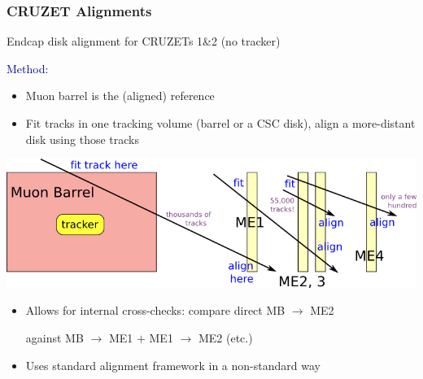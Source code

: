 \documentclass[compress]{beamer}
\begin{document}
\begin{frame}
\frametitle{CRUZET Alignments}
\small

\vspace{0.2 cm}
Endcap disk alignment for CRUZETs 1\&2 (no tracker)

\vspace{0.4 cm}
\hspace{-0.83 cm} \textcolor{darkblue}{\Large Method:}

\begin{itemize}
\item Muon barrel is the (aligned) reference
\item Fit tracks in one tracking volume (barrel or a CSC disk), align
  a more-distant disk using those tracks
\end{itemize}

\begin{center}
\includegraphics[width=0.8\linewidth]{fit_here_align_there.png}
\end{center}

\vspace{-0.4 cm}
\begin{itemize}
\item Allows for internal cross-checks: compare direct MB $\to$ ME2

against MB $\to$ ME1 $+$ ME1 $\to$ ME2 (etc.)

\item Uses standard alignment framework in a non-standard way
\end{itemize}
\end{frame}
\end{document}
